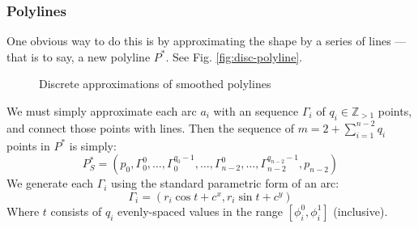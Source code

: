 \documentclass{article}
\begin{document}
\subsubsection{Polylines}
%
One obvious way to do this is by approximating the shape by a series of lines --- that is to say, a new polyline $P^*$.  See Fig. \ref{fig:disc-polyline}.
%
\begin{figure}
  \centering
  \hfill
  \caption{Discrete approximations of smoothed polylines}
\end{figure}
%
We must simply approximate each arc $a_i$ with an sequence $\Gamma_i$ of $q_i \in \mathbb{Z}_{>1}$ points, and connect those points with lines.  Then the sequence of $m = 2 + \sum^{n-2}_{i=1} q_i$ points in $P^*$ is simply:
%
\begin{equation}
  \label{eq:p-star}
  P^*_S = \left(p_0, \Gamma^0_0, \ldots, \Gamma^{q_0-1}_0, \ldots, \Gamma^{0}_{n-2}, \ldots, \Gamma^{q_{n-2}-1}_{n-2},  p_{n-2}\right)
\end{equation}
%
We generate each $\Gamma_i$ using the standard parametric form of an arc:
%
\begin{equation}
  \label{eq:arc-segments}
  \Gamma_i = \left(r_i \cos t + c^x, r_i \sin t + c^y\right)
\end{equation}
%
Where $t$ consists of $q_i$ evenly-spaced values in the range $\left[\phi^0_i, \phi^1_i\right]$ (inclusive).
%
\end{document}
